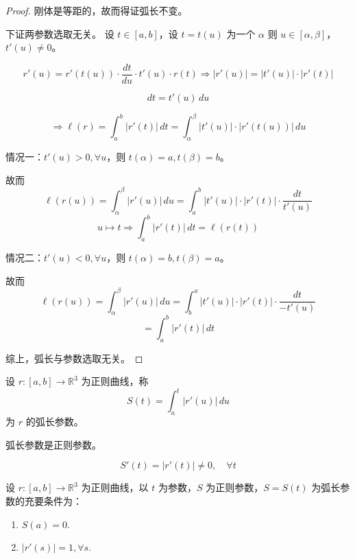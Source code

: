 \documentclass[lang=cn,10pt,thmcnt=section]{elegantbook}
\begin{document}
    \begin{proof}
    刚体是等距的，故而得证弧长不变。
    
    下证两参数选取无关。
    设 $t \in [a,b]$，设 $t = t(u)$ 为一个 $\alpha$ 则 $u \in [\alpha, \beta]$，$t'(u) \neq 0$。
    
    \[
    r'(u) = r'(t(u)) \cdot \frac{dt}{du} \cdot t'(u) \cdot r(t) \Rightarrow |r'(u)| = |t'(u)| \cdot |r'(t)|
    \]
    
    \[
    dt = t'(u) \, du
    \]
    
    \[
    \Rightarrow \ell(r) = \int_a^b |r'(t)| \, dt = \int_\alpha^\beta |t'(u)| \cdot |r'(t(u))| \, du
    \]
    
    情况一：$t'(u) > 0, \forall u$，则 $t(\alpha) = a, t(\beta) = b$。

故而
\[
\ell(r(u)) = \int_{\alpha}^{\beta} |r'(u)| \, du = \int_{a}^{b} |t'(u)|\cdot|r'(t)| \cdot \frac{dt}{t'(u)}
\]
\[
u \longmapsto t \Rightarrow \int_{a}^{b} |r'(t)| \, dt = \ell(r(t))
\]

情况二：$t'(u) < 0, \forall u$，则 $t(\alpha) = b, t(\beta) = a$。

故而
\[
\ell(r(u)) = \int_{\alpha}^{\beta} |r'(u)| \, du = \int_{b}^{a} |t'(u)| \cdot |r'(t)| \cdot \frac{dt}{-t'(u)}
\]
\[
= \int_{a}^{b} |r'(t)| \, dt
\]

综上，弧长与参数选取无关。
\end{proof}
\begin{definition}[弧长参数]
    设 $r: [a, b] \rightarrow \mathbb{R}^3$ 为正则曲线，称
    \[
    S(t) = \int_a^t |r'(u)| \, du
    \]
    为 $r$ 的弧长参数。
    \end{definition}
    
\begin{remark}
    弧长参数是正则参数。
    
    \[
    S'(t) = |r'(t)| \neq 0, \quad \forall t
    \]
\end{remark} 
\begin{proposition}[弧长参数的判别]
    设 $r: [a, b] \rightarrow \mathbb{R}^3$ 为正则曲线，以 $t$ 为参数，$S$ 为正则参数，$S = S(t)$ 为弧长参数的充要条件为：
    \begin{enumerate}
        \item $S(a) = 0$.
        \item $|r'(s)| = 1, \forall s$.
    \end{enumerate}
    \end{proposition}
    
\end{document}
